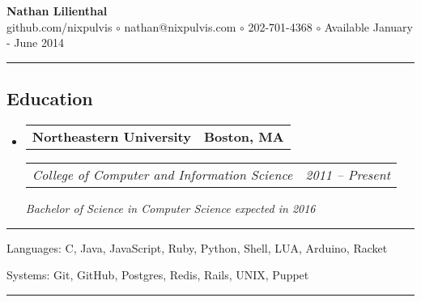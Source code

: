 \documentclass[10pt,letterpaper]{article}
\makeatletter
\newenvironment{indentsection}[1]
{\begin{list}{}
  {\setlength{\leftmargin}{#1}} \item[]
}
{\end{list}}
\newcommand{\headerrow}[2]
{\begin{tabular*}{\linewidth}{l@{\extracolsep{\fill}}r}
  #1 &
  #2 \\
\end{tabular*}}
\makeatother
\begin{document}
\begin{center}
  \huge \textbf{Nathan Lilienthal} \\
  \large
  github.com/nixpulvis
  $\circ$
  nathan@nixpulvis.com
  $\circ$
  202-701-4368
  $\circ$
  Available January - June 2014
  \vspace{-0.2em}
\end{center}

\hrule
\vspace{-0.4em}
\subsection*{Education}
\begin{itemize}
  \parskip=0.1em

  \item
  \headerrow
    {\textbf{Northeastern University}}
    {\textbf{Boston, MA}}
  \headerrow
    {\emph{College of Computer and Information Science}}
    {\emph{2011 -- Present}}
    {\emph{Bachelor of Science in Computer Science expected in 2016}}
\end{itemize}


\hrule
\begin{indentsection}{\parindent}
\begin{description*}
  \item[Languages:]
  C, Java, JavaScript, Ruby, Python, Shell, LUA, Arduino, Racket
  \item[Systems:]
  Git, GitHub, Postgres, Redis, Rails, UNIX, Puppet
\end{description*}
\end{indentsection}


\hrule
\vspace{-0.4em}
\end{document}
